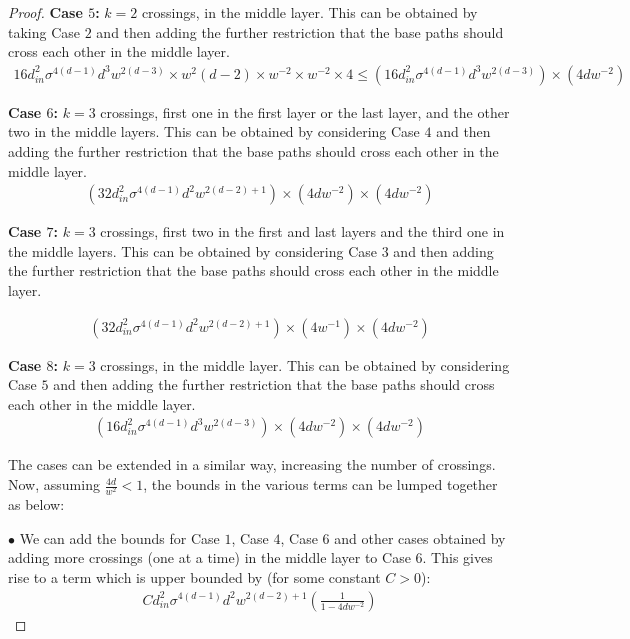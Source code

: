 \begin{appendix}
\begin{proof}
\textbf{Case $5$:} $k=2$ crossings, in the middle layer. This can be obtained by taking Case $2$ and then adding the further restriction that the base paths should cross each other in the middle layer. 
\begin{align*}
16d^2_{in}\sigma^{4(d-1)} d^3 w^{2(d-3)}\times w^2(d-2) \times w^{-2}\times w^{-2}\times 4\leq (16d^2_{in}\sigma^{4(d-1)} d^3 w^{2(d-3)}) \times (4dw^{-2})
\end{align*}


\textbf{Case $6$:} $k=3$ crossings, first one in the first layer or the last layer, and the other two in the middle layers. This can be obtained by considering Case $4$ and then adding the further restriction that the base paths should cross each other in the middle layer. 
\begin{align*}
(32d^2_{in}\sigma^{4(d-1)}d^2 w^{2(d-2)+1} )\times (4dw^{-2}) \times (4dw^{-2}) 
\end{align*}

\textbf{Case $7$:} $k=3$ crossings, first two in the first and last layers and the third one in the middle layers. This can be obtained by considering Case $3$ and then adding the further restriction that the base paths should cross each other in the middle layer. 

\begin{align*}
(32d^2_{in}\sigma^{4(d-1)}d^2 w^{2(d-2)+1})\times (4w^{-1})\times (4dw^{-2}) 
\end{align*}

\textbf{Case $8$:} $k=3$ crossings, in the middle layer. This can be obtained by considering Case $5$ and then adding the further restriction that the base paths should cross each other in the middle layer. 
\begin{align*}
 (16d^2_{in}\sigma^{4(d-1)} d^3 w^{2(d-3)}) \times (4dw^{-2})\times (4dw^{-2}) 
\end{align*}


The cases can be extended in a similar way, increasing the number of crossings.  Now, assuming $\frac{4d}{w^2}<1$, the bounds in the various terms can be lumped together as below:

$\bullet$ We can add the bounds for Case $1$, Case $4$, Case $6$ and other cases obtained by adding more crossings (one at a time) in the middle layer to Case $6$. This gives rise to a term which is upper bounded by (for some constant $C>0$): 
\begin{align*}
C d^2_{in}\sigma^{4(d-1)}d^2w^{2(d-2)+1}\left(\frac{1}{1-4dw^{-2}}\right)
\end{align*}


\end{proof}
\end{appendix}
